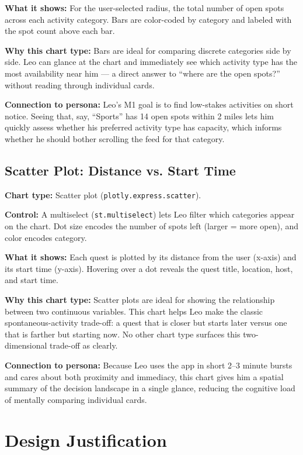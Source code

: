 \documentclass[11pt]{article}
\begin{document}
\textbf{What it shows:} For the user-selected radius, the total number of open spots across each activity category. Bars are color-coded by category and labeled with the spot count above each bar.

\textbf{Why this chart type:} Bars are ideal for comparing discrete categories side by side. Leo can glance at the chart and immediately see which activity type has the most availability near him --- a direct answer to ``where are the open spots?'' without reading through individual cards.

\textbf{Connection to persona:} Leo's M1 goal is to find low-stakes activities on short notice. Seeing that, say, ``Sports'' has 14 open spots within 2 miles lets him quickly assess whether his preferred activity type has capacity, which informs whether he should bother scrolling the feed for that category.

\subsection{Scatter Plot: Distance vs. Start Time}

\textbf{Chart type:} Scatter plot (\texttt{plotly.express.scatter}).

\textbf{Control:} A multiselect (\texttt{st.multiselect}) lets Leo filter which categories appear on the chart. Dot size encodes the number of spots left (larger = more open), and color encodes category.

\textbf{What it shows:} Each quest is plotted by its distance from the user (x-axis) and its start time (y-axis). Hovering over a dot reveals the quest title, location, host, and start time.

\textbf{Why this chart type:} Scatter plots are ideal for showing the relationship between two continuous variables. This chart helps Leo make the classic spontaneous-activity trade-off: a quest that is closer but starts later versus one that is farther but starting now. No other chart type surfaces this two-dimensional trade-off as clearly.

\textbf{Connection to persona:} Because Leo uses the app in short 2--3 minute bursts and cares about both proximity and immediacy, this chart gives him a spatial summary of the decision landscape in a single glance, reducing the cognitive load of mentally comparing individual cards.

\section{Design Justification}
\end{document}

